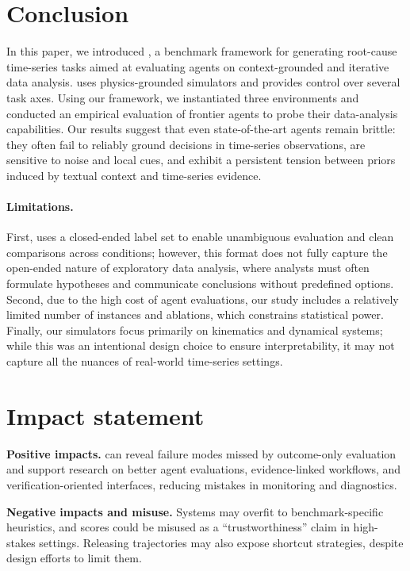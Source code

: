 \section{Conclusion}
In this paper, we introduced \name{}, a benchmark framework for generating root-cause time-series tasks aimed at evaluating agents on context-grounded and iterative data analysis.
\name{} uses physics-grounded simulators and provides control over several task axes.
Using our framework, we instantiated three environments and conducted an empirical evaluation of frontier agents to probe their data-analysis capabilities.
Our results suggest that even state-of-the-art agents remain brittle: they often fail to reliably ground decisions in time-series observations, are sensitive to noise and local cues, and exhibit a persistent tension between priors induced by textual context and time-series evidence.

\paragraph{Limitations.}
First, \name{} uses a closed-ended label set to enable unambiguous evaluation and clean comparisons across conditions; however, this format does not fully capture the open-ended nature of exploratory data analysis, where analysts must often formulate hypotheses and communicate conclusions without predefined options.
Second, due to the high cost of agent evaluations, our study includes a relatively limited number of instances and ablations, which constrains statistical power.
Finally, our simulators focus primarily on kinematics and dynamical systems; while this was an intentional design choice to ensure interpretability, it may not capture all the nuances of real-world time-series settings.

\section*{Impact statement}
\textbf{Positive impacts.} \name can reveal failure modes missed by outcome-only evaluation and support research on better agent evaluations, evidence-linked workflows, and verification-oriented interfaces, reducing mistakes in monitoring and diagnostics.

\textbf{Negative impacts and misuse.} Systems may overfit to benchmark-specific heuristics, and scores could be misused as a ``trustworthiness'' claim in high-stakes settings. Releasing trajectories may also expose shortcut strategies, despite design efforts to limit them.
